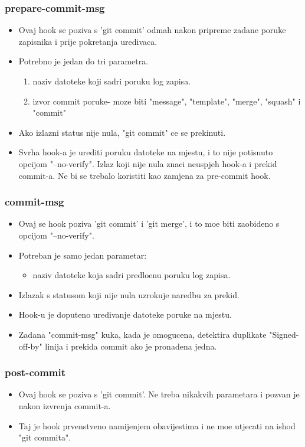 \documentclass{beamer}
\begin{document}
\begin{frame}
\frametitle{prepare-commit-msg}
\begin{itemize}
    \item Ovaj hook se poziva s 'git commit' odmah nakon pripreme zadane poruke zapisnika i prije pokretanja uredivaca.
    \item Potrebno je jedan do tri parametra.
    \begin{enumerate}
        \item naziv datoteke koji sadri poruku log zapisa.
        \item izvor commit poruke- moze biti "message", "template", "merge", "squash" i "commit"
    \end{enumerate}
    \item Ako izlazni status nije nula, "git commit" ce se prekinuti.
    \item Svrha hook-a je urediti poruku datoteke na mjestu, i to nije potisnuto opcijom "--no-verify". Izlaz koji nije nula znaci neuspjeh hook-a i prekid commit-a. Ne bi se trebalo koristiti kao zamjena za pre-commit hook.
\end{itemize}
\end{frame}

\begin{frame}
\frametitle{commit-msg}
\begin{itemize}
    \item Ovaj se hook poziva 'git commit' i 'git merge', i to moe biti
zaobideno s opcijom "--no-verify".
    \item Potreban je samo jedan parametar:
    \begin{itemize}
        \item naziv datoteke koja sadri predloenu poruku log zapisa.
    \end{itemize}
    \item Izlazak s statusom koji nije nula uzrokuje naredbu za prekid.
    \item Hook-u je doputeno uredivanje datoteke poruke na mjestu.
    \item Zadana "commit-msg" kuka, kada je omogucena, detektira duplikate "Signed-off-by" linija i prekida commit ako je pronadena jedna.
\end{itemize}
\end{frame}

\begin{frame}
\frametitle{post-commit}
\begin{itemize}
    \item Ovaj hook se poziva s 'git commit'. Ne treba nikakvih parametara i pozvan je nakon izvrenja commit-a.
    \item Taj je hook prvenstveno namijenjem obavijestima i ne moe utjecati na ishod "git commita".
\end{itemize}
\end{frame}
\end{document}
